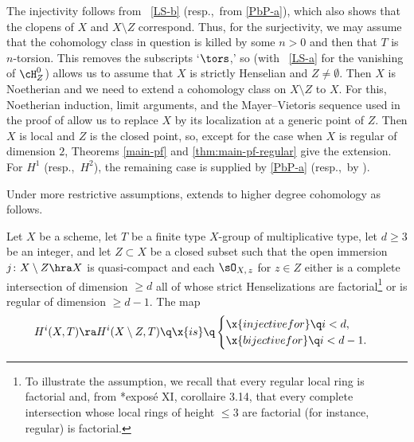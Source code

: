\item
The injectivity follows from ~\ref{LS-b} (resp.,~from \ref{PbP-a}), which also shows that the clopens of $X$ and $X \setminus Z$ correspond. Thus, for the surjectivity, we may assume that the cohomology class in question is killed by some $n > 0$ and then that $T$ is $n$-torsion. This removes the subscripts `$\tors$,' so  (with ~\ref{LS-a} for the vanishing of $\cH^0_Z$) allows us to assume that $X$ is strictly Henselian and $Z \neq \emptyset$. %
Then $X$ is Noetherian and we need to extend a cohomology class on $X\setminus Z$ to $X$. For this, Noetherian induction, limit arguments, and the Mayer--Vietoris sequence used in the proof of  allow us to replace $X$ by its localization at a generic point of $Z$. Then $X$ is local and $Z$ is the closed point, so, except for the case when $X$ is regular of dimension $2$, %
Theorems \ref{main-pf} and \ref{thm:main-pf-regular} give the extension. For $H^1$ (resp.,~$H^2$), the remaining case is supplied by \ref{PbP-a} (resp.,~by ).
\qedhere
\eenum
\epf





Under  more restrictive assumptions,  extends to higher degree cohomology as follows.


\bthm \label{P-c-pf}
Let $X$ be a scheme, let $T$ be a finite type $X$-group of multiplicative type, let $d \ge 3$ be an integer, and let $Z \subset X$ be a closed subset  such that the open immersion $j \colon X \setminus Z \hra X$ is quasi-compact and each $\sO_{X,\, z}$ for $z \in Z$ either is a complete intersection of dimension $\ge d$ all of whose strict Henselizations are factorial\footnote{To illustrate the assumption, we recall that every regular local ring is factorial and, from \cite{SGA2new}*{expos\'{e} XI, corollaire 3.14}, that every complete intersection whose local rings of height $\le 3$  are factorial (for instance, regular) is factorial.} or is regular of dimension $\ge d - 1$. The map
\[
H^i(X, T) \ra H^i(X \setminus Z, T)  \q\x{is} \q  \begin{cases}\x{injective for} \q  i < d, \\ \x{bijective for} \q i < d - 1.\end{cases}
\]
\ethm

